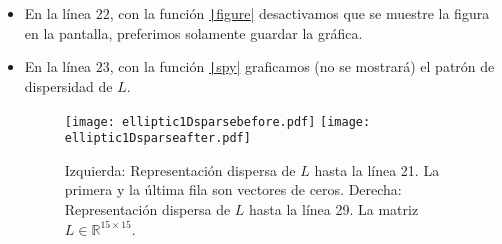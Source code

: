 \begin{itemize}
	      En la línea $21$, llamamos a la función
	      \href{https://carlosal1015.github.io/mole_examples/api_docs/matlab/src/matlab/lap.html}{\texttt|lap|},
	      este genera un operador Laplaciano discreto extendido que
	      requiere como argumentos obligatorios el orden de precisión
	      \texttt|k|, el número  de celdas
	      \texttt|m| y el tamaño de paso
	      \texttt|dx|.
	      \begin{equation*}
		      L=L^{\left(k\right)}=
		      D^{\left(k\right)}
		      G^{\left(k\right)}=
		      DG.\qquad\qquad
		      \left(
		      \difc.L.{}{}=\nabla\cdot\nabla
		      \right),
	      \end{equation*}
	      donde $D$ y $G$ son los operadores miméticos de divergencia
	      y gradiente, respectivamente.
	      Dado que
	      \begin{math}
		      D\in
		      \mathbb{R}^{\left(m+2\right)\times\left(m+1\right)}
	      \end{math}
	      y
	      \begin{math}
		      G\in
		      \mathbb{R}^{\left(m+1\right)\times\left(m+2\right)}
	      \end{math},
	      entonces
	      \begin{math}
		      L\in
		      \mathbb{R}^{\left(m+2\right)\times\left(m+2\right)}
	      \end{math}.

	\item

	      En la línea $22$, con la función
	      \href{https://docs.octave.org/v9.3.0/Figure-Properties.html#index-figure-visible}{\texttt|figure|}
	      desactivamos que se muestre la figura en la pantalla,
	      preferimos solamente guardar la gráfica.

	\item

	      En la línea $23$, con la función
	      \href{https://docs.octave.org/latest/Information.html#index-spy}{\texttt|spy|}
	      graficamos (no se mostrará) el patrón de dispersidad de
	      $L$.

	      \begin{figure}[ht!]
		      \centering
		      \texttt{[image: elliptic1Dsparsebefore.pdf]}
		      \texttt{[image: elliptic1Dsparseafter.pdf]}
		      \caption{Izquierda: Representación dispersa de $L$ hasta la línea
			      21.
			      La primera y la última fila son vectores de ceros.
			      Derecha: Representación dispersa de $L$ hasta la línea 29.
			      La matriz $L\in\mathbb{R}^{15\times 15}$.}
	      \end{figure}


\end{itemize}
